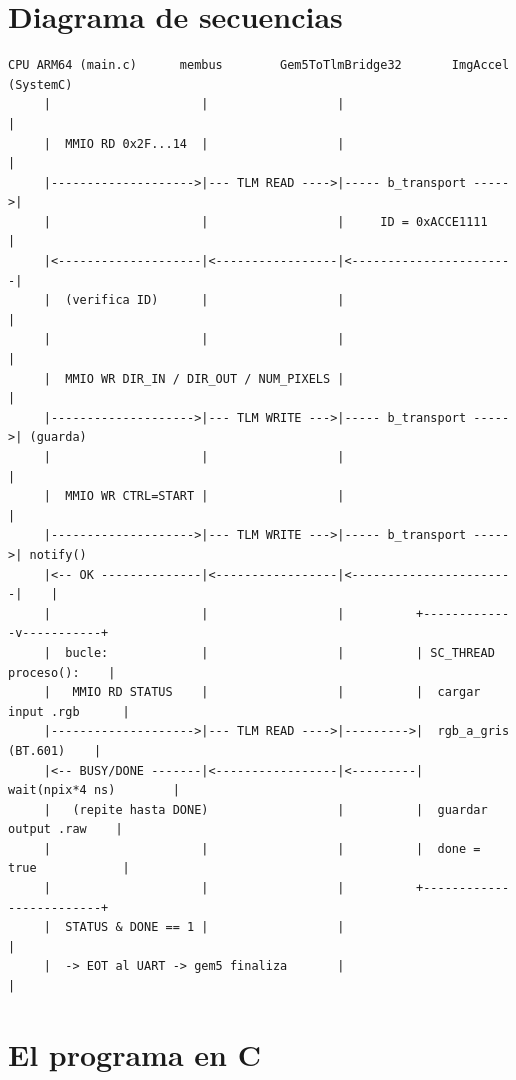 \documentclass[11pt,letterpaper]{article}
\begin{document}
\section{Diagrama de secuencias}

\begin{lstlisting}[style=diagrama,caption={Secuencia de operacion del prototipo virtual.}]
 CPU ARM64 (main.c)      membus        Gem5ToTlmBridge32       ImgAccel (SystemC)
     |                     |                  |                        |
     |  MMIO RD 0x2F...14  |                  |                        |
     |-------------------->|--- TLM READ ---->|----- b_transport ----->|
     |                     |                  |     ID = 0xACCE1111    |
     |<--------------------|<-----------------|<-----------------------|
     |  (verifica ID)      |                  |                        |
     |                     |                  |                        |
     |  MMIO WR DIR_IN / DIR_OUT / NUM_PIXELS |                        |
     |-------------------->|--- TLM WRITE --->|----- b_transport ----->| (guarda)
     |                     |                  |                        |
     |  MMIO WR CTRL=START |                  |                        |
     |-------------------->|--- TLM WRITE --->|----- b_transport ----->| notify()
     |<-- OK --------------|<-----------------|<-----------------------|    |
     |                     |                  |          +-------------v-----------+
     |  bucle:             |                  |          | SC_THREAD proceso():    |
     |   MMIO RD STATUS    |                  |          |  cargar input .rgb      |
     |-------------------->|--- TLM READ ---->|--------->|  rgb_a_gris (BT.601)    |
     |<-- BUSY/DONE -------|<-----------------|<---------|  wait(npix*4 ns)        |
     |   (repite hasta DONE)                  |          |  guardar output .raw    |
     |                     |                  |          |  done = true            |
     |                     |                  |          +-------------------------+
     |  STATUS & DONE == 1 |                  |                        |
     |  -> EOT al UART -> gem5 finaliza       |                        |
\end{lstlisting}

\section{El programa en C}
\end{document}
